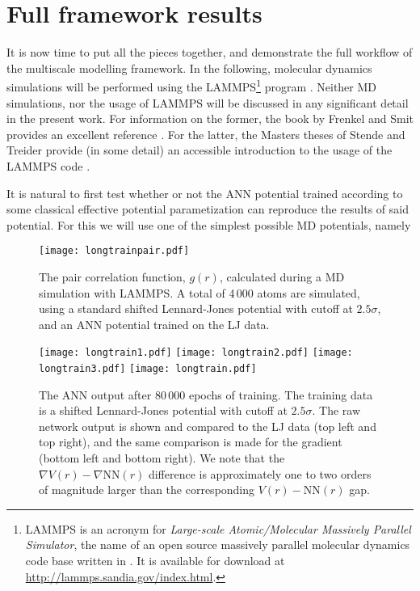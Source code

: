 \documentclass[../../master.tex]{subfiles}
\begin{document}
\chapter{Full framework results}
It is now time to put all the pieces together, and demonstrate the full workflow of the multiscale modelling framework. In the following, molecular dynamics simulations will be performed using the LAMMPS\footnote{LAMMPS is an acronym for \emph{Large-scale Atomic/Molecular Massively Parallel Simulator}, the name of an open source massively parallel molecular dynamics code base written in \CC{}. It is available for download at \url{http://lammps.sandia.gov/index.html}.} program \cite{plimpton1995fast}. Neither MD simulations, nor the usage of LAMMPS will be discussed in any significant detail in the present work. For information on the former, the book by Frenkel and Smit provides an excellent reference \cite{frenkel}. For the latter, the Masters theses of Stende and Treider provide (in some detail) an accessible introduction to the usage of the LAMMPS code \cite{stende,treider}. 

It is natural to first test whether or not the ANN potential trained according to some classical effective potential parametization can reproduce the results of said potential. For this we will use one of the simplest possible MD potentials, namely 


\begin{SCfigure}
\centering
\texttt{[image: longtrainpair.pdf]}
\caption{The pair correlation function, $g(r)$, calculated during a MD simulation with LAMMPS. A total of 4\,000 atoms are simulated, using a standard shifted Lennard-Jones potential with cutoff at $2.5\sigma$, and an ANN potential trained on the LJ data.\label{fig:ljpair}}
\end{SCfigure}


\begin{figure}
\centering
\texttt{[image: longtrain1.pdf]}
\texttt{[image: longtrain2.pdf]}
\texttt{[image: longtrain3.pdf]}
\texttt{[image: longtrain.pdf]}
\caption{The ANN output after 80\,000 epochs of training. The training data is a shifted Lennard-Jones potential with cutoff at $2.5\sigma$. The raw network output is shown and compared to the LJ data (top left and top right), and the same comparison is made for the gradient (bottom left and bottom right). We note that the $\nabla V(r)-\nabla \text{NN}(r)$ difference is approximately one to two orders of magnitude larger than the corresponding $V(r)-\text{NN}(r)$ gap.  \label{fig:longtrain}}
\end{figure}
\end{document}
